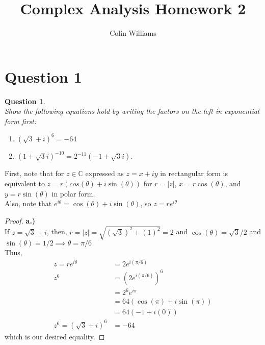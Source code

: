 \documentclass[10pt,a4paper]{article}
\title{Complex Analysis Homework 2}
\author{Colin Williams}
\newtheorem*{question*}{Question}
\begin{document}
\maketitle
\section*{Question 1}
\begin{question*}{$ $}
\\Show the following equations hold by writing the factors on the left in exponential form first:
\begin{enumerate}[label = \alph*.)]
\item $(\sqrt{3} + i)^6 = -64$
\item $(1 + \sqrt{3}i)^{-10} = 2^{-11}(-1 + \sqrt{3}i)$.
\end{enumerate}
\end{question*}

First, note that for $z \in \mathbb{C}$ expressed as $z = x + iy$ in rectangular form is equivalent to $z = r(cos(\theta) + i\sin(\theta))$ for $r = |z|$, $x = r\cos(\theta)$, and $y = r\sin(\theta)$ in polar form.\\
Also, note that $e^{i\theta} = \cos(\theta) + i\sin(\theta)$, so $z = re^{i\theta}$

\begin{proof}{\textbf{a.)}}
\\If $z = \sqrt{3} + i$, then, $r = |z| = \sqrt{(\sqrt{3})^2 + (1)^2} = 2$ and $\cos(\theta) = \sqrt{3}/2$ and $\sin(\theta) = 1/2 \implies \theta = \pi/6$\\
Thus,
\begin{align*}
z = re^{i\theta} &= 2e^{i(\pi/6)}\\
z^{6} &= (2e^{i(\pi/6)})^6\\
&= 2^6e^{i\pi}\\
&= 64(\cos(\pi) + i\sin(\pi))\\
&= 64(-1 + i(0))\\
z^6 = (\sqrt{3} + i)^6 &= -64
\end{align*}
which is our desired equality.
\end{proof}
\end{document}
